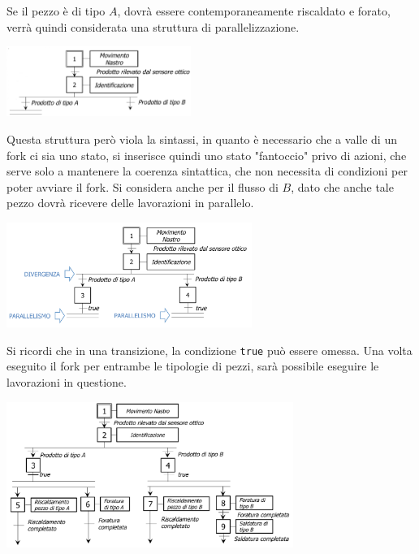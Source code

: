 \documentclass[10pt, letterpaper]{report}
\begin{document}
Se il pezzo è di tipo $A$, dovrà essere contemporaneamente riscaldato e forato, verrà quindi considerata una struttura di parallelizzazione.
\begin{center}
    \includegraphics[width=0.45\textwidth ]{images/esempioPezzi3.png}
\end{center}
Questa struttura però viola la sintassi, in quanto è necessario che a valle di un fork ci sia uno stato, si inserisce quindi uno stato "fantoccio" privo di azioni, che serve solo a mantenere la coerenza sintattica, che non necessita di condizioni per poter avviare il fork. Si considera anche per il flusso di $B$, dato che anche tale pezzo dovrà ricevere delle lavorazioni in parallelo.
\begin{center}
    \includegraphics[width=0.6\textwidth ]{images/esempioPezzi4.png}
\end{center}
Si ricordi che in una transizione, la condizione \texttt{true} può essere omessa. Una volta eseguito il fork per entrambe le tipologie di pezzi, sarà possibile eseguire le lavorazioni in questione.
\begin{center}
    \includegraphics[width=0.7\textwidth ]{images/esempioPezzi5.png}
\end{center}
\end{document}
